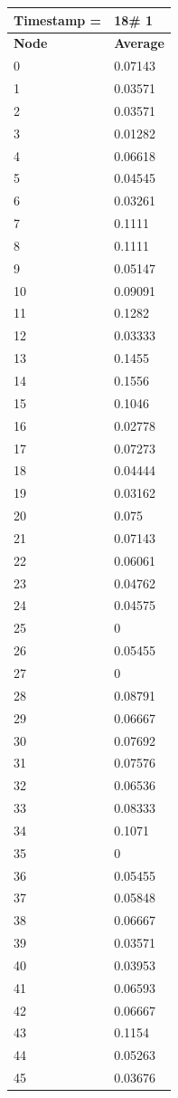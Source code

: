 \begin{tabular}{|l||l|}
\hline
\textbf{Timestamp =} & \textbf{18}\# 1\\\hline
	\textbf{Node} & \textbf{Average} \\ \hline
\hline
	0 & 0.07143 \\ \hline
	1 & 0.03571 \\ \hline
	2 & 0.03571 \\ \hline
	3 & 0.01282 \\ \hline
	4 & 0.06618 \\ \hline
	5 & 0.04545 \\ \hline
	6 & 0.03261 \\ \hline
	7 & 0.1111 \\ \hline
	8 & 0.1111 \\ \hline
	9 & 0.05147 \\ \hline
	10 & 0.09091 \\ \hline
	11 & 0.1282 \\ \hline
	12 & 0.03333 \\ \hline
	13 & 0.1455 \\ \hline
	14 & 0.1556 \\ \hline
	15 & 0.1046 \\ \hline
	16 & 0.02778 \\ \hline
	17 & 0.07273 \\ \hline
	18 & 0.04444 \\ \hline
	19 & 0.03162 \\ \hline
	20 & 0.075 \\ \hline
	21 & 0.07143 \\ \hline
	22 & 0.06061 \\ \hline
	23 & 0.04762 \\ \hline
	24 & 0.04575 \\ \hline
	25 & 0 \\ \hline
	26 & 0.05455 \\ \hline
	27 & 0 \\ \hline
	28 & 0.08791 \\ \hline
	29 & 0.06667 \\ \hline
	30 & 0.07692 \\ \hline
	31 & 0.07576 \\ \hline
	32 & 0.06536 \\ \hline
	33 & 0.08333 \\ \hline
	34 & 0.1071 \\ \hline
	35 & 0 \\ \hline
	36 & 0.05455 \\ \hline
	37 & 0.05848 \\ \hline
	38 & 0.06667 \\ \hline
	39 & 0.03571 \\ \hline
	40 & 0.03953 \\ \hline
	41 & 0.06593 \\ \hline
	42 & 0.06667 \\ \hline
	43 & 0.1154 \\ \hline
	44 & 0.05263 \\ \hline
	45 & 0.03676 \\ \hline
\end{tabular}
